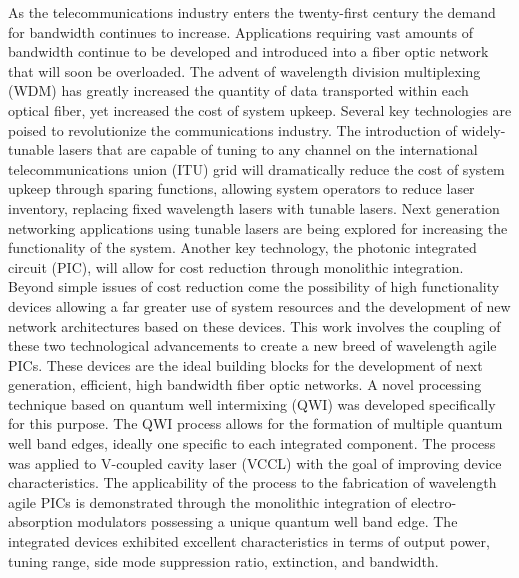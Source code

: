 \documentclass{ZJUthesis}
\begin{document}
\begin{englishabstract}
As the telecommunications industry enters the twenty-first century the demand for bandwidth continues to increase. Applications requiring vast amounts of bandwidth continue to be developed and introduced into a fiber optic network that will soon be overloaded. The advent of wavelength division multiplexing (WDM) has greatly increased the quantity of data transported within each optical fiber, yet increased the cost of system upkeep. Several key technologies are poised to revolutionize the communications industry. The introduction of widely-tunable lasers that are capable of tuning to any channel on the international telecommunications union (ITU) grid will dramatically reduce the cost of system upkeep through sparing functions, allowing system operators to reduce laser inventory, replacing fixed wavelength lasers with tunable lasers. Next generation networking applications using tunable lasers are being explored for increasing the functionality of the system. Another key technology, the photonic integrated circuit (PIC), will allow for cost reduction through monolithic integration. Beyond simple issues of cost reduction come the possibility of high functionality devices allowing a far greater use of system resources and the development of new network architectures based on these devices. This work involves the coupling of these two technological advancements to create a new breed of wavelength agile PICs. These devices are the ideal building blocks for the development of next generation, efficient, high bandwidth fiber optic networks. A novel processing technique based on quantum well intermixing (QWI) was developed specifically for this purpose. The QWI process allows for the formation of multiple quantum well band edges, ideally one specific to each integrated component. The process was applied to V-coupled cavity laser (VCCL) with the goal of improving device characteristics. The applicability of the process to the fabrication of wavelength agile PICs is demonstrated through the monolithic integration of electro-absorption modulators possessing a unique quantum well band edge. The integrated devices exhibited excellent characteristics in terms of output power, tuning range, side mode suppression ratio, extinction, and bandwidth.

\end{englishabstract}
\end{document}
